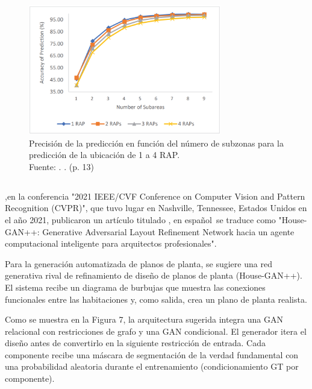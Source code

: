\begin{figure}[!ht]
	\begin{center}
		\includegraphics[width=0.75\textwidth]{2/figures/ketkha2022.png}
		\caption[Precisión de la predicción en función del número de subzonas para la predicción de la ubicación de 1 a 4 RAP.]{Precisión de la predicción en función del número de subzonas para la predicción de la ubicación de 1 a 4 RAP.\\
		Fuente: \cite{pr_ketkhaw2019deepl}. . (p. 13)}
		\label{2:fig114}
	\end{center}
\end{figure}

\subsection{}
\cite{pr_nauata2021housegan} ,en la conferencia "2021 IEEE/CVF Conference on Computer Vision and Pattern Recognition (CVPR)", que tuvo lugar en Nashville, Tennessee, Estados Unidos en el año 2021, publicaron un artículo titulado , en español se traduce como "House-GAN++: Generative Adversarial Layout Refinement Network hacia un agente computacional inteligente para arquitectos profesionales".

Para la generación automatizada de planos de planta, se sugiere una red generativa rival de refinamiento de diseño de planos de planta (House-GAN++). El sistema recibe un diagrama de burbujas que muestra las conexiones funcionales entre las habitaciones y, como salida, crea un plano de planta realista.

Como se muestra en la Figura 7, la arquitectura sugerida integra una GAN relacional con restricciones de grafo y una GAN condicional. El generador itera el diseño antes de convertirlo en la siguiente restricción de entrada. Cada componente recibe una máscara de segmentación de la verdad fundamental con una probabilidad aleatoria durante el entrenamiento (condicionamiento GT por componente).

